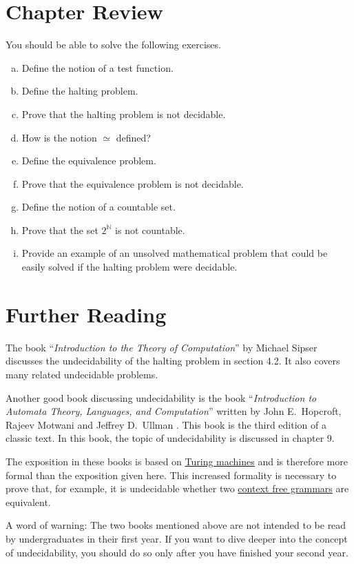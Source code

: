 \section{Chapter Review}
You should be able to solve the following exercises.
\begin{enumerate}[(a)]
\item Define the notion of a test function.
\item Define the halting problem.
\item Prove that the halting problem is not decidable.
\item How is the notion $\simeq$ defined?
\item Define the equivalence problem.
\item Prove that the equivalence problem is not decidable.
\item Define the notion of a countable set.
\item Prove that the set $2^{\mathbb{N}}$ is not countable.
\item Provide an example of an unsolved mathematical problem that could be easily solved if the halting problem
      were decidable. 
\end{enumerate}
\pagebreak

\section{Further Reading}
The book ``\emph{Introduction to the Theory of Computation}'' by Michael Sipser \cite{sipser:1996}
discusses the undecidability of the halting problem in section 4.2.  It also covers many related
undecidable problems.

Another good book discussing undecidability is the book 
``\emph{Introduction to Automata Theory, Languages, and Computation}'' written by John E.~Hopcroft,
Rajeev Motwani and Jeffrey D.~Ullman \cite{hopcroft:06}.  This book is the third edition of a
classic text.  In this book, the topic of undecidability is discussed in chapter 9.

The exposition in these books is based on
\href{https://en.wikipedia.org/wiki/Turing_machine}{Turing machines} and is therefore more formal than the
exposition given here.  This increased formality is necessary to prove that, for example, it is undecidable
whether two \href{https://en.wikipedia.org/wiki/Context-free_grammar}{context free grammars} are equivalent.

A word of warning: The two books mentioned above are not intended to be read by undergraduates in their first
year.  If you want to dive deeper into the concept of undecidability, you should do so only after you have
finished your second year.



